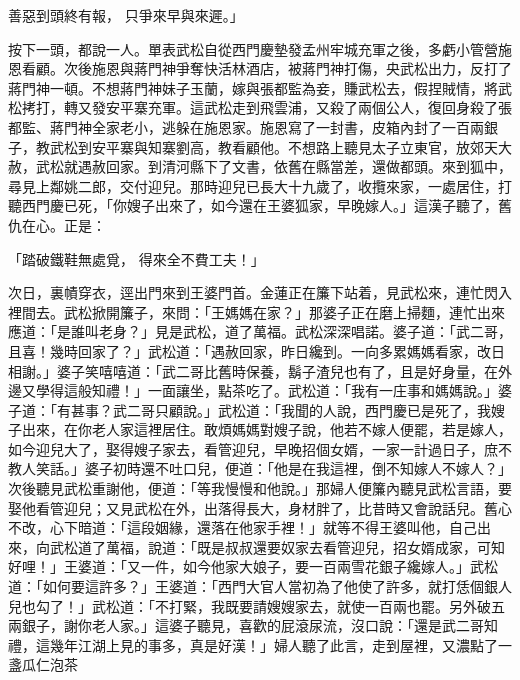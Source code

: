 善惡到頭終有報，  只爭來早與來遲。」

按下一頭，都說一人。單表武松自從西門慶墊發孟州牢城充軍之後，多虧小管營施恩看顧。次後施恩與蔣門神爭奪快活林酒店，被蔣門神打傷，央武松出力，反打了蔣門神一頓。不想蔣門神妹子玉蘭，嫁與張都監為妾，賺武松去，假捏賊情，將武松拷打，轉又發安平寨充軍。這武松走到飛雲浦，又殺了兩個公人，復回身殺了張都監、蔣門神全家老小，逃躲在施恩家。施恩寫了一封書，皮箱內封了一百兩銀子，教武松到安平寨與知寨劉高，教看顧他。不想路上聽見太子立東官，放郊天大赦，武松就遇赦回家。到清河縣下了文書，依舊在縣當差，還做都頭。來到狐中，尋見上鄰姚二郎，交付迎兒。那時迎兒已長大十九歲了，收攬來家，一處居住，打聽西門慶已死，「你嫂子出來了，如今還在王婆狐家，早晚嫁人。」這漢子聽了，舊仇在心。正是：

「踏破鐵鞋無處覓，  得來全不費工夫！」

次日，裏幘穿衣，逕出門來到王婆門首。金蓮正在簾下站着，見武松來，連忙閃入裡間去。武松掀開簾子，來問：「王媽媽在家？」那婆子正在磨上掃麵，連忙出來應道：「是誰叫老身？」見是武松，道了萬福。武松深深唱諾。婆子道：「武二哥，且喜！幾時回家了？」武松道：「遇赦回家，昨日纔到。一向多累媽媽看家，改日相謝。」婆子笑嘻嘻道：「武二哥比舊時保養，鬍子渣兒也有了，且是好身量，在外邊又學得這般知禮！」一面讓坐，點茶吃了。武松道：「我有一庄事和媽媽說。」婆子道：「有甚事？武二哥只顧說。」武松道：「我聞的人說，西門慶已是死了，我嫂子出來，在你老人家這裡居住。敢煩媽媽對嫂子說，他若不嫁人便罷，若是嫁人，如今迎兒大了，娶得嫂子家去，看管迎兒，早晚招個女婿，一家一計過日子，庶不教人笑話。」婆子初時還不吐口兒，便道：「他是在我這裡，倒不知嫁人不嫁人？」次後聽見武松重謝他，便道：「等我慢慢和他說。」那婦人便簾內聽見武松言語，要娶他看管迎兒；又見武松在外，出落得長大，身材胖了，比昔時又會說話兒。舊心不改，心下暗道：「這段姻緣，還落在他家手裡！」就等不得王婆叫他，自己出來，向武松道了萬福，說道：「既是叔叔還要奴家去看管迎兒，招女婿成家，可知好哩！」王婆道：「又一件，如今他家大娘子，要一百兩雪花銀子纔嫁人。」武松道：「如何要這許多？」王婆道：「西門大官人當初為了他使了許多，就打恁個銀人兒也勾了！」武松道：「不打緊，我既要請嫂嫂家去，就使一百兩也罷。另外破五兩銀子，謝你老人家。」這婆子聽見，喜歡的屁滾尿流，沒口說：「還是武二哥知禮，這幾年江湖上見的事多，真是好漢！」婦人聽了此言，走到屋裡，又濃點了一盞瓜仁泡茶 